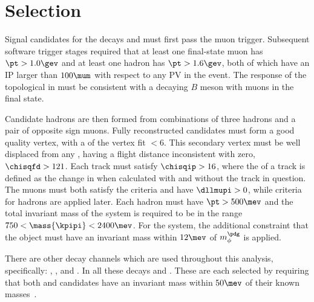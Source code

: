\section{Selection}

Signal candidates for the decays \btokpipimumu and \btophikmumu must first pass the \lone muon
trigger.
Subsequent software trigger stages required that at least one final-state muon has $\pt>1.0\gev$
and at least one hadron has $\pt>1.6\gev$, both of which have an IP larger than $100\mum$ with
respect to any PV in the event.
The response of the topological \BBDT in \hlttwo must be consistent with a decaying $B$ meson
with muons in the final state.


Candidate \Bp hadrons are then formed from combinations of three hadrons and a pair of opposite
sign muons.
Fully reconstructed candidates must form a good quality vertex, with a \chisq of the vertex fit
$<6$.
This secondary vertex must be well displaced from any \PV, having a flight distance inconsistent
with zero, $\chisqfd>121$.
Each track must satisfy $\chisqip>16$, where the \chisqip of a track is defined as the change in
\chisqip when calculated with and without the track in question.
The muons must both satisfy the \ismuon criteria and have $\dllmupi>0$,
while \pid criteria for hadrons are applied later.
Each hadron must have $\pt>500\mev$ and
the total invariant mass of the \kpipi system is required to be in the range
$750<\mass{\kpipi}<2400\mev$.
For the \phik system, the additional constraint that the \decay{\phi}{\kk} object must have an
invariant mass within $12\mev$ of $m_\phi^\pdg$ is applied.

There are other decay channels which are used throughout this analysis, specifically:
\btojpsikpipi, \btopsitwosk, and \btojpsiphik.
In all these decays \psitwostojpsipipi and \jpsitomumu.
These are each selected by requiring that both \jpsi and \psitwos candidates have an invariant
mass within $50\mev$ of their known masses~\cite{PDG2012}.



